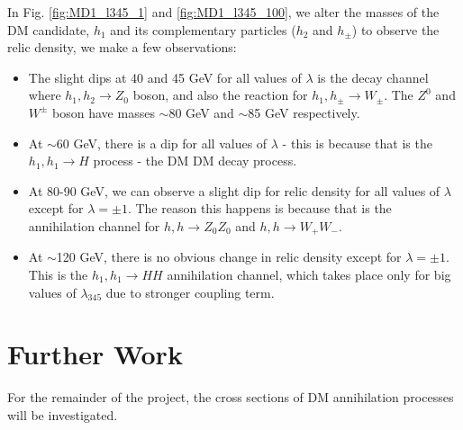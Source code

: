 \documentclass[12pt]{article}
\begin{document}
In Fig. \ref{fig:MD1_l345_1} and \ref{fig:MD1_l345_100}, we alter the masses of the DM candidate, $h_1$ and its complementary particles ($h_2$ and $h_{\pm}$) to observe the relic density, we make a few observations:
\begin{itemize}
    \item The slight dips at 40 and 45 GeV for all values of $\lambda$ is the decay channel where $h_1, h_2 \rightarrow Z_0$ boson, and also the reaction for $h_1, h_{\pm} \rightarrow W_\pm$. The $Z^0$ and $W^\pm$ boson have masses $\sim$80 GeV and $\sim$85 GeV respectively.
    \item At $\sim$60 GeV, there is a dip for all values of $\lambda$ - this is because that is the $h_1,h_1\rightarrow H$ process - the DM DM decay process. 
    \item At 80-90 GeV, we can observe a slight dip for relic density for all values of $\lambda$ except for $\lambda = \pm1$. The reason this happens is because that is the annihilation channel for $h, h \rightarrow Z_0Z_0$ and $h, h \rightarrow W_+ W_-$.
    \item At $\sim$120 GeV, there is no obvious change in relic density except for $\lambda = \pm1$. This is the $h_1,h_1\rightarrow H H$ annihilation channel, which takes place only for big values of $\lambda_{345}$ due to stronger coupling term.
\end{itemize}

\section{Further Work}
For the remainder of the project, the cross sections of DM annihilation processes will be investigated. 
\newpage



\newpage
\end{document}
